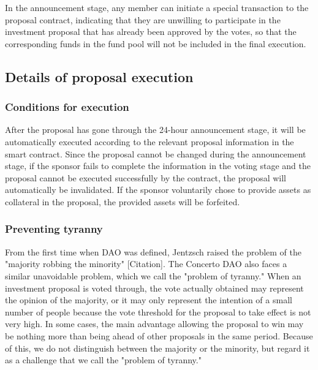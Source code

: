 \documentclass[UTF8]{article}
\begin{document}
\begin{multicols}{2}
  In the announcement stage, any member can initiate a special transaction to the proposal contract, indicating that they are unwilling to participate in the investment proposal that has already been approved by the votes, so that the corresponding funds in the fund pool will not be included in the final execution.


\subsection{Details of proposal execution}

\subsubsection{Conditions for execution}

After the proposal has gone through the 24-hour announcement stage, it will be automatically executed according to the relevant proposal information in the smart contract. Since the proposal cannot be changed during the announcement stage, if the sponsor fails to complete the information in the voting stage and the proposal cannot be executed successfully by the contract, the proposal will automatically be invalidated. If the sponsor voluntarily chose to provide assets as collateral in the proposal, the provided assets will be forfeited.

\subsubsection{Preventing tyranny}

From the first time when DAO was defined, Jentzsch raised the problem of the "majority robbing the minority" [Citation]. The Concerto DAO also faces a similar unavoidable problem, which we call the "problem of tyranny." When an investment proposal is voted through, the vote actually obtained may represent the opinion of the majority, or it may only represent the intention of a small number of people because the vote threshold for the proposal to take effect is not very high. In some cases, the main advantage allowing the proposal to win may be nothing more than being ahead of other proposals in the same period. Because of this, we do not distinguish between the majority or the minority, but regard it as a challenge that we call the "problem of tyranny."


\end{multicols}
\end{document}
